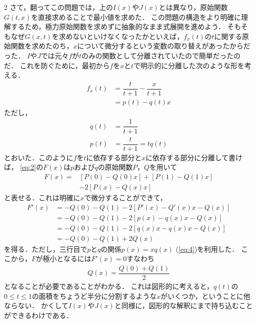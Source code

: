 \documentclass[../../main.tex]{subfiles}
\begin{document}
\begin{multicols}{2}
  さて，翻ってこの問題では，上の$I(x)$や$J(x)$とは異なり，原始関数$G(t,x)$を直接求めることで最小値を求めた．
  この問題の構造をより明確に理解するため，極力原始関数を求めずに抽象的なまま式展開を進めよう．
  そもそもなぜ$G(x,t)$を求めないといけなくなったかといえば，$f_{x}(t)$の$t$に関する原始関数を求めたのち，$x$について微分するという変数の取り替えがあったからだった．
  $I$や$J$では元々$f$が$t$のみの関数として分離されていたので簡単だったのだ．
  これを防ぐために，最初から$f$を$x$と$t$で明示的に分離した次のような形を考える．
  \begin{align}
    f_{x}(t)
    & = \dfrac{t}{t+1} - \dfrac{x}{t+1} \\
    & = p(t) - q(t) x
  \end{align}
  ただし，
  \begin{align}
    q(t) & = \dfrac{1}{t+1}                             \\
    p(t) & = \dfrac{t}{t+1} = tq(t) \label{eq:4}
  \end{align}
  とおいた．このように$f$を$t$に依存する部分と$x$に依存する部分に分離して書けば，
  \cref{eq:2}の$F(x)$は$p$および$q$の原始関数$P$，$Q$を用いて
  \begin{align}
    F(x) =
    & \left[P(0)-Q(0)x \right] + \left[P(1)-Q(1)x \right] \\
    & -2 \left[P(x)-Q(x)x \right]\label{eq:5}
  \end{align}
  と表せる．これは明確に$x$で微分することができて，
  \begin{align}
    F'(x)
    & = -Q(0) - Q(1) -2 \left[P'(x)-Q'(x)x -Q(x)\right] \\
    & = -Q(0) - Q(1) -2 \left[p(x)-q(x)x -Q(x)\right]   \\
    & = -Q(0) - Q(1) -2 \left[q(x)x-q(x)x -Q(x)\right]  \\
    & = -Q(0) - Q(1) + 2Q(x)
  \end{align}
  を得る．ただし，三行目で$p$と$q$の関係$p(x)=xq(x)$ (\cref{eq:4})を利用した．
  ここから，$F$が極小となるには$F'(x)=0$すなわち
  \begin{align}
    Q(x) = \dfrac{Q(0)+Q(1)}{2} \label{eq:6}
  \end{align}
  となることが必要であることがわかる．
  これは図形的に考えると，$q(t)$の$0\le t\le 1$の面積をちょうど半分に分割するような$x$がいくつか，ということに他ならない．
  かくして$I(x)$や$J(x)$と同様に，図形的な解釈にまで持ち込むことができるわけである．

  \begin{figure}[H]
    \centering
\end{figure}
\end{multicols}
\end{document}
